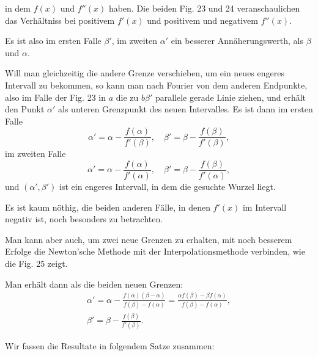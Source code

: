 in dem $f(x)$ und $f''(x)$  haben. Die
beiden Fig. 23 und 24 veranschaulichen das Verh\"altniss bei positivem
 $f'(x)$ und positivem und negativem $f''(x)$.

Es ist also im ersten Falle $\beta'$, im zweiten $\alpha'$ ein besserer
Ann\"aherungswerth, als $\beta$ und $\alpha$.

Will man gleichzeitig die andere Grenze verschieben, um
ein neues engeres Intervall zu bekommen, so kann man nach
Fourier von dem anderen Endpunkte, also im Falle der Fig. 23
in $a$ die zu $b\beta'$ parallele gerade Linie ziehen, und erh\"alt den
Punkt $\alpha'$ als unteren Grenzpunkt des neuen Intervalles. Es ist
dann im ersten Falle
\[
\alpha' = \alpha - \frac{f(\alpha)}{f'(\beta)}, \quad \beta' = \beta - \frac{f(\beta)}{f'(\beta)},
\]
im zweiten Falle
\[
\alpha' = \alpha - \frac{f(\alpha)}{f'(\alpha)}, \quad \beta' = \beta - \frac{f(\beta)}{f'(\alpha)},
\]
und $(\alpha', \beta')$ ist ein engeres Intervall, in dem die gesuchte Wurzel liegt.


Es ist kaum n\"othig, die beiden
anderen F\"alle, in denen $f'(x)$ im Intervall
 negativ ist, noch besonders zu
betrachten.

Man kann aber auch, um zwei
neue Grenzen zu erhalten, mit noch
besserem Erfolge die Newton'sche
Methode mit der Interpolationsmethode
verbinden, wie die Fig. 25 zeigt.

Man erh\"alt dann als die beiden
neuen Grenzen:
\[
\begin{gathered}
\alpha' = \alpha - \frac{f(\alpha)(\beta - \alpha)}{f(\beta) - f(\alpha)} = \frac{\alpha f(\beta) - \beta f(\alpha)}{f(\beta) - f(\alpha)}, \\
\beta' = \beta - \frac{f(\beta)}{f'(\beta)}.
\end{gathered}
\]

Wir fassen die Resultate in folgendem Satze zusammen:

